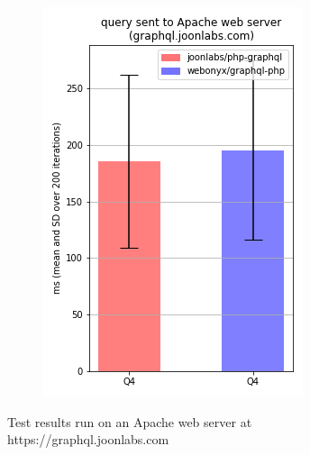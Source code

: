 \documentclass[11pt, a4paper]{article}
\begin{document}
\begin{figure}
\begin{subfigure}{.5\textwidth}
  \label{localhost_Q3}
\end{subfigure}%
\begin{subfigure}{.5\textwidth}
  \centering
  \includegraphics[width=.75\linewidth]{results/joonlabs_Q4.png}
  \label{localhost_Q4}
\end{subfigure}%
\caption{Test results run on an Apache web server at https://graphql.joonlabs.com}
\label{figure2}
\end{figure}
\end{document}
